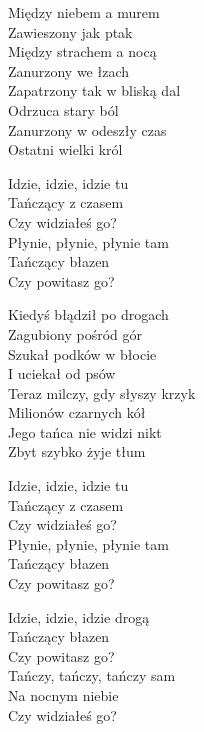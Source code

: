 \begin{text}
    Między niebem a murem\\
    Zawieszony jak ptak\\
    Między strachem a nocą\\
    Zanurzony we łzach\\
    Zapatrzony tak w bliską dal\\
    Odrzuca stary ból\\
    Zanurzony w odeszły czas\\
    Ostatni wielki król

    \vin Idzie, idzie, idzie tu\\
    \vin Tańczący z czasem\\
    \vin Czy widziałeś go?\\
    \vin Płynie, płynie, płynie tam\\
    \vin Tańczący błazen\\
    \vin Czy powitasz go?

    Kiedyś błądził po drogach\\
    Zagubiony pośród gór\\
    Szukał podków w błocie\\
    I uciekał od psów\\
    Teraz milczy, gdy słyszy krzyk\\
    Milionów czarnych kół\\
    Jego tańca nie widzi nikt\\
    Zbyt szybko żyje tłum

    \vin Idzie, idzie, idzie tu\\
    \vin Tańczący z czasem\\
    \vin Czy widziałeś go?\\
    \vin Płynie, płynie, płynie tam\\
    \vin Tańczący błazen\\
    \vin Czy powitasz go?

    \vin Idzie, idzie, idzie drogą\\
    \vin Tańczący błazen\\
    \vin Czy powitasz go?\\
    \vin Tańczy, tańczy, tańczy sam\\
    \vin Na nocnym niebie\\
    \vin Czy widziałeś go?    
\end{text}
